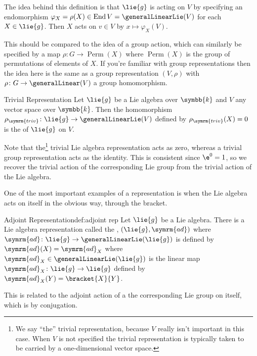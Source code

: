 \documentclass[fleqn]{NotesClass}
\renewcommand{\field}{\symbb{k}}
\DeclareMathOperator{\End}{End}
\newcommand{\ad}{\symrm{ad}}
\DeclareMathOperator{\Perm}{Perm}
\begin{document}
    The idea behind this definition is that \(\lie{g}\) is acting on \(V\) by specifying an endomorphism \(\varphi_X = \rho(X) \in \End V = \generalLinearLie(V)\) for each \(X \in \lie{g}\).
    Then \(X\) acts on \(v \in V\) by \(x \mapsto \varphi_X(V)\).
        
    This should be compared to the idea of a group action, which can similarly be specified by a map \(\rho \colon G \to \Perm(X)\) where \(\Perm(X)\) is the group of permutations of elements of \(X\).
    If you're familiar with group representations then the idea here is the same as a group representation \((V, \rho)\) with \(\rho \colon G \to \generalLinear(V)\) a group homomorphism.
    
    \begin{exm}{Trivial Representation}{}
        Let \(\lie{g}\) be a Lie algebra over \(\field\) and \(V\) any vector space over \(\field\).
        Then the homomorphism \(\rho_{\symrm{triv}} \colon \lie{g} \to \generalLinearLie(V)\) defined by \(\rho_{\symrm{triv}}(X) = 0\) is the  of \(\lie{g}\) on \(V\).
    \end{exm}
    
    Note that the\footnote{We say \enquote{the} trivial representation, because \(V\) really isn't important in this case. When \(V\) is not specified the trivial representation is typically taken to be carried by a one-dimensional vector space.} trivial Lie algebra representation acts as zero, whereas a trivial group representation acts as the identity.
    This is consistent since \(\e^0 = 1\), so we recover the trivial action of the corresponding Lie group from the trivial action of the Lie algebra.
    
    One of the most important examples of a representation is when the Lie algebra acts on itself in the obvious way, through the bracket.
    
    \begin{dfn}{Adjoint Representation}{def:adjoint rep}
        Let \(\lie{g}\) be a Lie algebra.
        There is a Lie algebra representation called the , \((\lie{g}, \ad)\) where \(\ad \colon \lie{g} \to \generalLinearLie(\lie{g})\) is defined by \(\ad(X) = \ad_X\) where \(\ad_X \in \generalLinearLie(\lie{g})\) is the linear map \(\ad_X \colon \lie{g} \to \lie{g}\) defined by \(\ad_X(Y) = \bracket{X}{Y}\).
    \end{dfn}
    
    This is related to the adjoint action of a the corresponding Lie group on itself, which is by conjugation.
    
\end{document}
